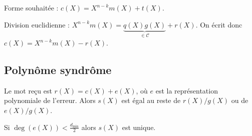 	Forme souhaitée : $c(X) = X^{n - k} m(X) + t(X)$.
	
	Division euclidienne : $X^{n - k} m(X) = \underset{\in \mathcal{C}}{\underbrace{q(X)g(X)}} + r(X)$.
	On écrit donc $c(X) = X^{n - k} m(X) - r(X)$.


\subsection{Polynôme syndrôme}

	Le mot reçu est $r(X) = c(X) + e(X)$, où $e$ est la représentation polynomiale de l'erreur.
	Alors $s(X)$ est égal au reste de $r(X)/g(X)$ ou de $e(X)/g(X)$.

	Si $\deg(e(X)) < \frac{d_{\min}}{2}$ alors $s(X)$ est unique.
